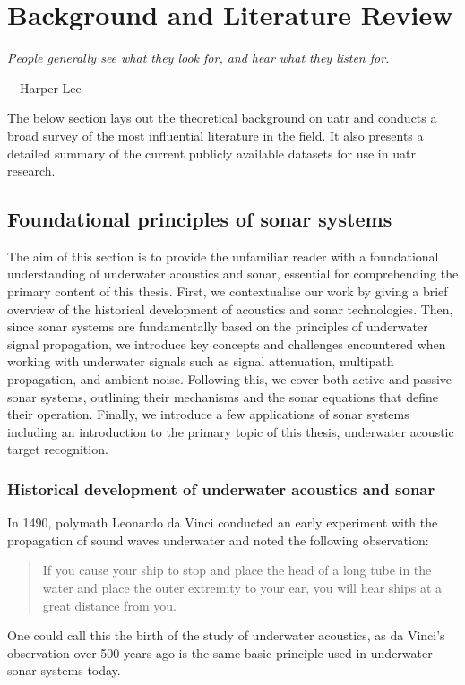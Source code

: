 \chapter{Background and Literature Review}

\epigraph{\itshape People generally see what they look for, and hear what they listen for.}{---Harper Lee}

The below section lays out the theoretical background on \acrfull{uatr} and conducts a broad survey of the most influential literature in the field. It also presents a detailed summary of the current publicly available datasets for use in \acrshort{uatr} research.

\section{Foundational principles of sonar systems}

The aim of this section is to provide the unfamiliar reader with a foundational understanding of underwater acoustics and sonar, essential for comprehending the primary content of this thesis. First, we contextualise our work by giving a brief overview of the historical development of acoustics and sonar technologies. Then, since sonar systems are fundamentally based on the principles of underwater signal propagation, we introduce key concepts and challenges encountered when working with underwater signals such as signal attenuation, multipath propagation, and ambient noise. Following this, we cover both active and passive sonar systems, outlining their mechanisms and the sonar equations that define their operation. Finally, we introduce a few applications of sonar systems including an introduction to the primary topic of this thesis, underwater acoustic target recognition.

\subsection{Historical development of underwater acoustics and sonar}\label{sec:uw-history}

In 1490, polymath Leonardo da Vinci conducted an early experiment with the propagation of sound waves underwater and noted the following observation:
\begin{quote}
    If you cause your ship to stop and place the head of a long tube in the water and place the outer extremity to your ear, you will hear ships at a great distance from you. \cite{urick_principles_1975}
\end{quote}
One could call this the birth of the study of underwater acoustics, as da Vinci's observation over 500 years ago is the same basic principle used in underwater sonar systems today.

